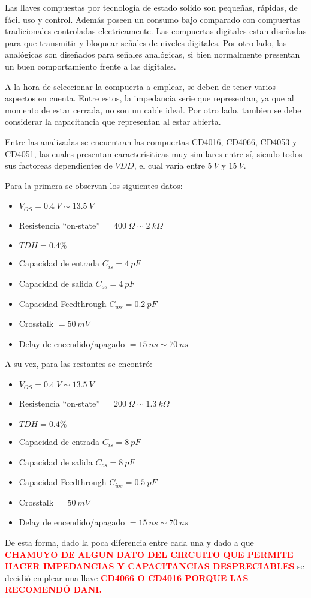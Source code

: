 


Las llaves compuestas por tecnología de estado solido son pequeñas, rápidas, de fácil uso y control. Además poseen un consumo bajo comparado con compuertas tradicionales controladas electricamente. Las compuertas digitales estan diseñadas para que transmitir y bloquear señales de niveles digitales. Por otro lado, las analógicas son diseñados para señales analógicas, si bien normalmente presentan un buen comportamiento frente a las digitales.

A la hora de seleccionar la compuerta a emplear, se deben de tener varios aspectos en cuenta. Entre estos, la impedancia serie que representan, ya que al momento de estar cerrada, no son un cable ideal. Por otro lado, tambien se debe considerar la capacitancia que representan al estar abierta.

Entre las analizadas se encuentran las compuertas \href{http://www.ti.com/lit/ds/symlink/cd4016b.pdf}{CD4016}, \href{http://www.ti.com/lit/ds/symlink/cd4066b.pdf}{CD4066}, \href{http://www.ti.com/lit/ds/symlink/cd4051b.pdf}{CD4053} y \href{http://www.ti.com/lit/ds/symlink/cd4051b.pdf}{CD4051}, las cuales presentan caracterísiticas muy similares entre sí, siendo todos sus factoreas dependientes de $VDD$, el cual varía entre $5 \ V$ y $15 \ V$.

Para la primera se observan los siguientes datos:
\begin{multicols}{2}
\begin{itemize}
	\item $V_{OS} = 0.4 \ V \sim 13.5 \ V$
	\item Resistencia ``on-state'' $= 400 \ \Omega \sim 2 \ k\Omega$
	\item $TDH = 0.4\%$
	\item Capacidad de entrada $C_{is} = 4 \ pF$
	\item Capacidad de salida $C_{os} = 4 \ pF$
	\item Capacidad Feedthrough $C_{ios} = 0.2 \ pF$
	\item Crosstalk $= 50 \ mV$
	\item Delay de encendido/apagado $= 15 \ ns \sim 70 \ ns$
\end{itemize}
\end{multicols}

A su vez, para las restantes se encontró:
\begin{multicols}{2}
\begin{itemize}
	\item $V_{OS} = 0.4 \ V \sim 13.5 \ V$
	\item Resistencia ``on-state'' $= 200 \ \Omega \sim 1.3 \ k\Omega$
	\item $TDH = 0.4\%$
	\item Capacidad de entrada $C_{is} = 8 \ pF$
	\item Capacidad de salida $C_{os} = 8 \ pF$
	\item Capacidad Feedthrough $C_{ios} = 0.5 \ pF$
	\item Crosstalk $= 50 \ mV$
	\item Delay de encendido/apagado $= 15 \ ns \sim 70 \ ns$
\end{itemize}
\end{multicols}

De esta forma, dado la poca diferencia entre cada una y dado a que \textcolor{red}{\textbf{CHAMUYO DE ALGUN DATO DEL CIRCUITO QUE PERMITE HACER IMPEDANCIAS Y CAPACITANCIAS DESPRECIABLES}} se decidió emplear una llave \textcolor{red}{\textbf{CD4066 O CD4016 PORQUE LAS RECOMENDÓ DANI.}}

